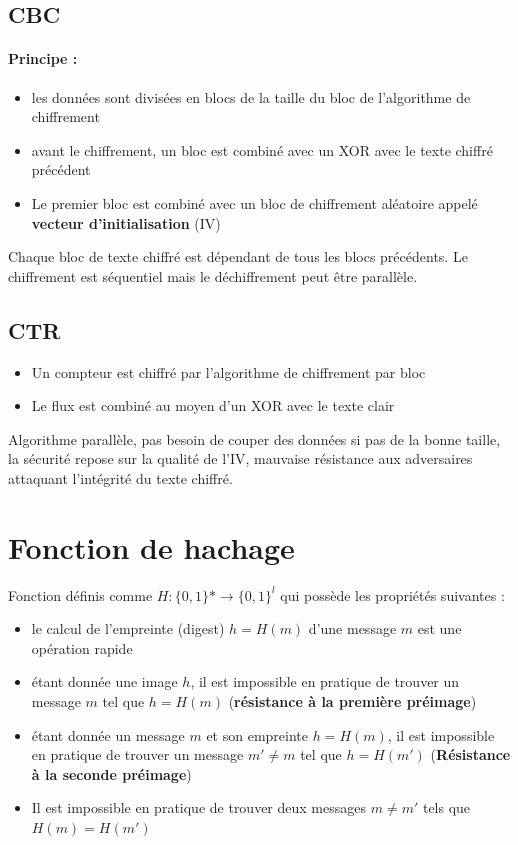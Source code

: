 \documentclass[11pt,a4paper]{report}
\begin{document}
\subsection{CBC}

\paragraph*{Principe : }
\begin{itemize}
    \item les données sont divisées en blocs de la taille du bloc de l'algorithme de chiffrement
    \item avant le chiffrement, un bloc est combiné avec un XOR avec le texte chiffré précédent
    \item Le premier bloc est combiné avec un bloc de chiffrement aléatoire appelé \textbf{vecteur d'initialisation} (IV)
\end{itemize}

Chaque bloc de texte chiffré est dépendant de tous les blocs précédents. Le chiffrement est séquentiel mais le déchiffrement peut être parallèle.

\subsection{CTR}

\begin{itemize}
    \item Un compteur est chiffré par l'algorithme de chiffrement par bloc
    \item Le flux est combiné au moyen d'un XOR avec le texte clair
\end{itemize}

Algorithme parallèle, pas besoin de couper des données si pas de la bonne taille, la sécurité repose sur la qualité de l'IV, mauvaise résistance aux adversaires attaquant l'intégrité du texte chiffré.

\section{Fonction de hachage}

Fonction définis comme $H:\{0,1\}* \rightarrow \{0,1\}^l$ qui possède les propriétés suivantes :
\begin{itemize}
    \item le calcul de l'empreinte (digest) $h = H(m)$ d'une message $m$ est une opération rapide
    \item étant donnée une image $h$, il est impossible en pratique de trouver un message $m$ tel que $h=H(m)$ (\textbf{résistance à la première préimage})
    \item étant donnée un message $m$ et son empreinte $h=H(m)$, il est impossible en pratique de trouver un message $m'\neq m$ tel que $h=H(m')$ (\textbf{Résistance à la seconde préimage})
    \item Il est impossible en pratique de trouver deux messages $m \neq m'$ tels que $H(m) = H(m')$
\end{itemize}
\end{document}
